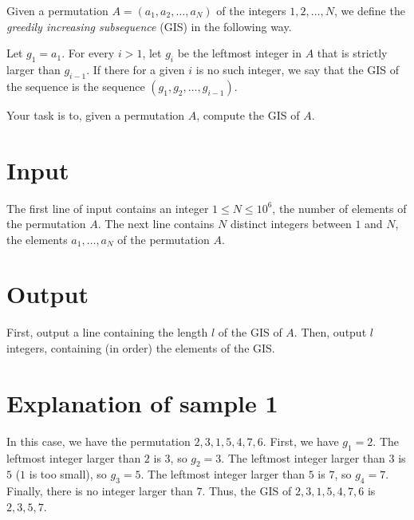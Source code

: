 Given a permutation $A = (a_1, a_2, \dots, a_N)$ of the integers $1, 2, \dots, N$, we define the \emph{greedily increasing subsequence} (GIS) in the following way.

Let $g_1 = a_1$. For every $i > 1$, let $g_i$ be the leftmost integer in $A$ that is strictly larger than $g_{i-1}$.
If there for a given $i$ is no such integer, we say that the GIS of the sequence is the sequence $(g_1, g_2, ..., g_{i - 1})$.

Your task is to, given a permutation $A$, compute the GIS of $A$.

\section*{Input}
The first line of input contains an integer $1 \le N \le 10^6$, the number of elements of the permutation $A$.
The next line contains $N$ distinct integers between $1$ and $N$, the elements $a_1, \dots, a_N$ of the permutation $A$.

\section*{Output}
First, output a line containing the length $l$ of the GIS of $A$.
Then, output $l$ integers, containing (in order) the elements of the GIS.

\section*{Explanation of sample 1}
In this case, we have the permutation  $2, 3, 1, 5, 4, 7, 6$.
First, we have $g_1 = 2$.
The leftmost integer larger than $2$ is $3$, so $g_2 = 3$.
The leftmost integer larger than $3$ is $5$ ($1$ is too small), so $g_3 = 5$.
The leftmost integer larger than $5$ is $7$, so $g_4 = 7$.
Finally, there is no integer larger than $7$.
Thus, the GIS of $2, 3, 1, 5, 4, 7, 6$ is $2, 3, 5, 7$.
